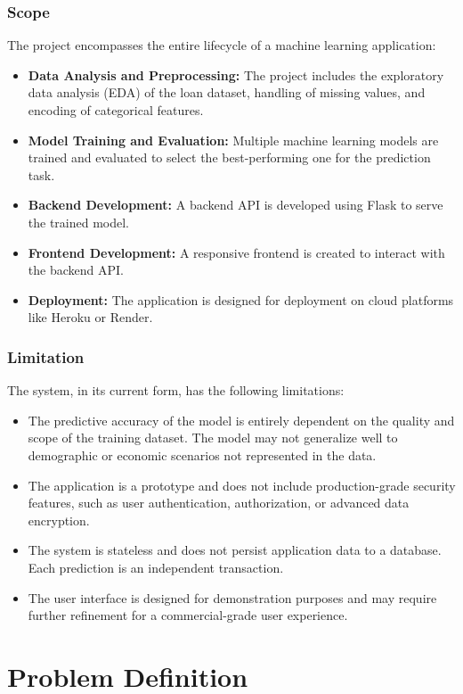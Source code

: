 \documentclass{report}
\begin{document}
\subsection{Scope}
The project encompasses the entire lifecycle of a machine learning application:
\begin{itemize}
    \item \textbf{Data Analysis and Preprocessing:} The project includes the exploratory data analysis (EDA) of the loan dataset, handling of missing values, and encoding of categorical features.
    \item \textbf{Model Training and Evaluation:} Multiple machine learning models are trained and evaluated to select the best-performing one for the prediction task.
    \item \textbf{Backend Development:} A backend API is developed using Flask to serve the trained model.
    \item \textbf{Frontend Development:} A responsive frontend is created to interact with the backend API.
    \item \textbf{Deployment:} The application is designed for deployment on cloud platforms like Heroku or Render.
\end{itemize}

\subsection{Limitation}
The system, in its current form, has the following limitations:
\begin{itemize}
    \item The predictive accuracy of the model is entirely dependent on the quality and scope of the training dataset. The model may not generalize well to demographic or economic scenarios not represented in the data.
    \item The application is a prototype and does not include production-grade security features, such as user authentication, authorization, or advanced data encryption.
    \item The system is stateless and does not persist application data to a database. Each prediction is an independent transaction.
    \item The user interface is designed for demonstration purposes and may require further refinement for a commercial-grade user experience.
\end{itemize}

\chapter{Problem Definition}
\end{document}
